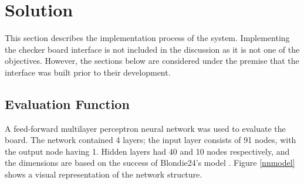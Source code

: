 \documentclass[12pt,a4paper]{article}
\begin{document}
\section{Solution}


        
    This section describes the implementation process of the system. Implementing the checker board interface is not included in the discussion as it is not one of the objectives. However, the sections below are considered under the premise that the interface was built prior to their development.

    \subsection{Evaluation Function}
        
        A feed-forward multilayer perceptron neural network was used to evaluate the board. The network contained 4 layers; the input layer consists of 91 nodes, with the output node having 1. Hidden layers had 40 and 10 nodes respectively, and the dimensions are based on the success of Blondie24's model \cite{chellapilla_evolving_1999}. Figure \ref{nnmodel} shows a visual representation of the network structure.
\end{document}
